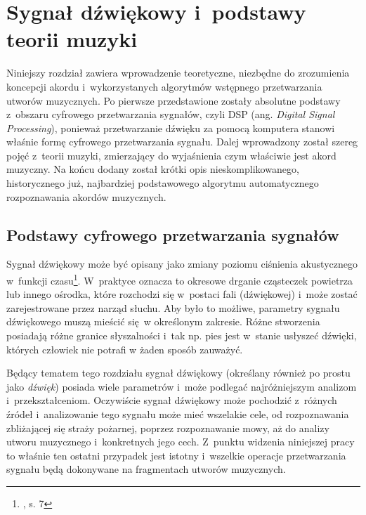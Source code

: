 \chapter{Sygnał dźwiękowy i~podstawy teorii muzyki} \label{chapter:music_theory}

Niniejszy rozdział zawiera wprowadzenie teoretyczne, niezbędne do zrozumienia koncepcji akordu i~wykorzystanych algorytmów wstępnego przetwarzania utworów muzycznych. Po pierwsze przedstawione zostały absolutne podstawy z~obszaru cyfrowego przetwarzania sygnałów, czyli DSP (ang. \emph{Digital Signal Processing}), ponieważ przetwarzanie dźwięku za pomocą komputera stanowi właśnie formę cyfrowego przetwarzania sygnału. Dalej wprowadzony został szereg pojęć z~teorii muzyki, zmierzający do wyjaśnienia czym właściwie jest akord muzyczny. Na końcu dodany został krótki opis nieskomplikowanego, historycznego już, najbardziej podstawowego algorytmu automatycznego rozpoznawania akordów muzycznych.



\section{Podstawy cyfrowego przetwarzania sygnałów}

Sygnał dźwiękowy może być opisany jako zmiany poziomu ciśnienia akustycznego w~funkcji czasu\footnote{\cite{lerch_introduction_2012}, s. 7}. W~praktyce oznacza to okresowe drganie cząsteczek powietrza lub innego ośrodka, które rozchodzi się w~postaci fali (dźwiękowej) i~może zostać zarejestrowane przez narząd słuchu. Aby było to możliwe, parametry sygnału dźwiękowego muszą mieścić się w określonym zakresie. Różne stworzenia posiadają różne granice słyszalności i~tak np. pies jest w~stanie usłyszeć dźwięki, których człowiek nie potrafi w żaden sposób zauważyć. 

Będący tematem tego rozdziału sygnał dźwiękowy (określany również po prostu jako \emph{dźwięk}) posiada wiele parametrów i~może podlegać najróżniejszym analizom i~przekształceniom.  Oczywiście sygnał dźwiękowy może pochodzić z~różnych źródeł i~analizowanie tego sygnału może mieć wszelakie cele, od rozpoznawania zbliżającej się straży pożarnej, poprzez rozpoznawanie mowy, aż do analizy utworu muzycznego i~konkretnych jego cech. Z~punktu widzenia niniejszej pracy to właśnie ten ostatni przypadek jest istotny i~wszelkie operacje przetwarzania sygnału będą dokonywane na fragmentach utworów muzycznych.

